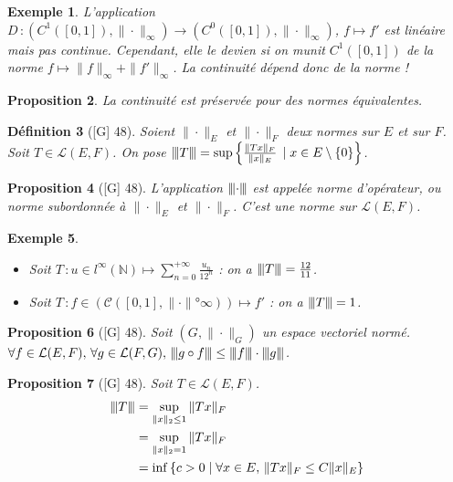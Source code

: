 \documentclass[10pt, a4paper, parskip=full, twoside, twocolumn]{report}
\newtheorem{definition}{Définition}
\newtheorem{proposition}[definition]{Proposition}
\newtheorem{example}[definition]{Exemple}
\newcommand{\IN}{\mathbb{N}}
\newcommand{\vertiii}[1]{{\left\vert\kern-0.25ex\left\vert\kern-0.25ex\left\vert #1 
    \right\vert\kern-0.25ex\right\vert\kern-0.25ex\right\vert}}
\begin{document}
\begin{example}
	L'application $D\,\colon \left(C^1([0,1]),\|\cdot\|_{\infty}\right)\to \left(C^0([0,1]), \|\cdot\|_{\infty}\right)$, $f\mapsto f'$ est 
	linéaire mais pas continue. Cependant, elle le devien si on munit $C^1([0,1])$ de la norme $f\mapsto \|f\|_{\infty} + \|f'\|_{\infty}$. La continuité dépend donc de la norme !
\end{example}

\begin{proposition}
	La continuité est préservée pour des normes équivalentes.
\end{proposition}

\begin{definition}[\textnormal{[G] 48}]
	Soient $\|\cdot\|_E$ et $\|\cdot\|_F$ deux normes sur $E$ et sur $F$. Soit $T\in\mathcal{L}(E,F)$.
	On pose $\vertiii{T} = \sup \left\{\frac{\|Tx\|_F}{\|x\|_E}\,\mid x\in E\setminus \left\{0\right\}\right\}$.
\end{definition}

\begin{proposition}[\textnormal{[G] 48}]
	L'application $\vertiii{\cdot}$ est appelée \emph{norme d'opérateur}, ou \emph{norme subordonnée à $\|\cdot\|_E$ et $\|\cdot\|_F$}. C'est une norme sur $\mathcal{L}(E,F)$. 
\end{proposition}

\begin{example}
	\begin{itemize}
		\item Soit $T\,\colon u\in l^{\infty}(\IN)\mapsto \sum_{n=0}^{+\infty} \frac{u_n}{12^n}$ : on a $\vertiii{T} = \frac{12}{11}$.
		\item Soit $T\,\colon f\in\left(\mathcal{C}([0,1], \|\cdot\|°{\infty})\right) \mapsto f'$ : on a $\vertiii{T} = 1$.
	\end{itemize}
\end{example}

\begin{proposition}[\textnormal{[G] 48}]
	Soit $(G,\|\cdot\|_G)$ un espace vectoriel normé.
	$\forall f\in \mathcal{L}(E,F),\,\forall g\in\mathcal{L}(F,G),\, \vertiii{g\circ f}\leq \vertiii{f}\cdot\vertiii{g}$.
\end{proposition}

\begin{proposition}[\textnormal{[G] 48}]
	Soit $T\in\mathcal{L}(E,F)$.
	\begin{align*}
		\vertiii{T} &= \sup_{\|x\|_2\leq 1} \|Tx\|_F \\
		&= \sup_{\|x\|_2 = 1} \|Tx\|_F \\
		&= \inf\left\{c>0\mid \forall x\in E,\, \|Tx\|_F \leq C\|x\|_E\right\}
	\end{align*}
\end{proposition}
\end{document}
